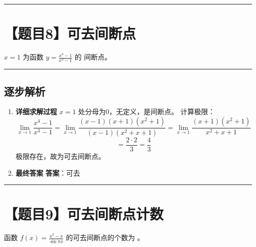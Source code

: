 \documentclass[UTF8]{ctexart}
\newenvironment{redenv}{\color{red}}{}
\newenvironment{detailedanalysis}{%
    \color{red}
    \begin{enumerate}[label=\textbf{第\arabic*步：}, leftmargin=*, align=left, itemsep=1.5ex]
}{%
    \end{enumerate}
}
\newcommand{\problemrule}{\noindent\rule{\textwidth}{1.5pt}\vspace{-0.8em}}
\newcommand{\analysisrule}{\noindent\rule{\textwidth}{0.8pt}\vspace{-0.8em}}
\newcommand{\blank}[1]{\underline{\hspace{#1}}}
\begin{document}
\problemrule
\section*{【题目8】可去间断点}
$ x = 1 $ 为函数 $ y = \frac{x^{4}-1}{x^{3}-1} $ 的 \blank{2cm} 间断点。

\begin{redenv}
\analysisrule
\subsection*{逐步解析}

\begin{detailedanalysis}
\item \textbf{详细求解过程}
$x=1$ 处分母为0，无定义，是间断点。
计算极限：
$$ \lim_{x \to 1} \frac{x^4-1}{x^3-1} = \lim_{x \to 1} \frac{(x-1)(x+1)(x^2+1)}{(x-1)(x^2+x+1)} = \lim_{x \to 1} \frac{(x+1)(x^2+1)}{x^2+x+1} $$
$$ = \frac{2 \cdot 2}{3} = \frac{4}{3} $$
极限存在，故为可去间断点。

\item \textbf{最终答案}
\textbf{答案}：可去
\end{detailedanalysis}
\end{redenv}

\problemrule
\section*{【题目9】可去间断点计数}
函数 $ f(x)=\frac{x^{3}-x}{\sin\pi x} $ 的可去间断点的个数为 \blank{2cm}。
\end{document}
